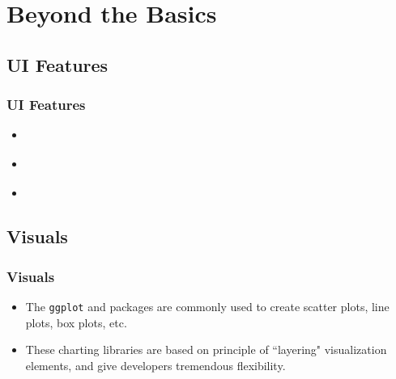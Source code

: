 \documentclass[
	11pt, %
]{beamer}
\begin{document}


\section{Beyond the Basics}

%	
%	

\subsection{UI Features}
\begin{frame}
	\frametitle{UI Features}
	
	\begin{itemize}
		\item\href{https://shiny.rstudio.com/gallery/widget-gallery.html}{\color{blue}{Widgets}}
		\item \href{http://shinyapps.dreamrs.fr/shinyWidgets/}{\color{blue}{Even more widgets}}
		\item \href{https://shiny.rstudio.com/articles/progress.html}{\color{blue}{Progress bars}}
		\end{itemize}
\end{frame}




\subsection{Visuals}

\begin{frame}
	\frametitle{Visuals}
	
	\begin{itemize}
		\item The \texttt{ggplot} and \href{https://plotly.com/r/}{} packages are commonly used to create scatter plots, line plots, box plots, etc.
		\item These charting libraries are based on principle of ``layering" visualization elements, and give developers tremendous flexibility.
	\end{itemize}
\end{frame}
\end{document}
